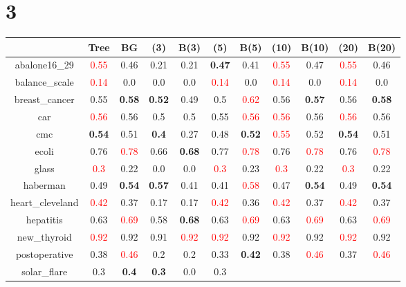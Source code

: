 \documentclass{article}%
\begin{document}
\section*{3}%
\begin{tabular}{c|cccccccccc}%
\hline%
&Tree&BG&(3)&B(3)&(5)&B(5)&(10)&B(10)&(20)&B(20)\\%
\hline%
abalone16\_29&\textcolor{red}{ 
0.55
}&0.46&0.21&0.21&\textbf{0.47}&0.41&\textcolor{red}{ 
0.55
}&0.47&\textcolor{red}{ 
0.55
}&0.46\\%
\hline%
balance\_scale&\textcolor{red}{ 
0.14
}&0.0&0.0&0.0&\textcolor{red}{ 
0.14
}&0.0&\textcolor{red}{ 
0.14
}&0.0&\textcolor{red}{ 
0.14
}&0.0\\%
\hline%
breast\_cancer&0.55&\textbf{0.58}&\textbf{0.52}&0.49&0.5&\textcolor{red}{ 
0.62
}&0.56&\textbf{0.57}&0.56&\textbf{0.58}\\%
\hline%
car&\textcolor{red}{ 
0.56
}&0.56&0.5&0.5&0.55&\textcolor{red}{ 
0.56
}&\textcolor{red}{ 
0.56
}&0.56&\textcolor{red}{ 
0.56
}&0.56\\%
\hline%
cmc&\textbf{0.54}&0.51&\textbf{0.4}&0.27&0.48&\textbf{0.52}&\textcolor{red}{ 
0.55
}&0.52&\textbf{0.54}&0.51\\%
\hline%
ecoli&0.76&\textcolor{red}{ 
0.78
}&0.66&\textbf{0.68}&0.77&\textcolor{red}{ 
0.78
}&0.76&\textcolor{red}{ 
0.78
}&0.76&\textcolor{red}{ 
0.78
}\\%
\hline%
glass&\textcolor{red}{ 
0.3
}&0.22&0.0&0.0&\textcolor{red}{ 
0.3
}&0.23&\textcolor{red}{ 
0.3
}&0.22&\textcolor{red}{ 
0.3
}&0.22\\%
\hline%
haberman&0.49&\textbf{0.54}&\textbf{0.57}&0.41&0.41&\textcolor{red}{ 
0.58
}&0.47&\textbf{0.54}&0.49&\textbf{0.54}\\%
\hline%
heart\_cleveland&\textcolor{red}{ 
0.42
}&0.37&0.17&0.17&\textcolor{red}{ 
0.42
}&0.36&\textcolor{red}{ 
0.42
}&0.37&\textcolor{red}{ 
0.42
}&0.37\\%
\hline%
hepatitis&0.63&\textcolor{red}{ 
0.69
}&0.58&\textbf{0.68}&0.63&\textcolor{red}{ 
0.69
}&0.63&\textcolor{red}{ 
0.69
}&0.63&\textcolor{red}{ 
0.69
}\\%
\hline%
new\_thyroid&\textcolor{red}{ 
0.92
}&0.92&0.91&\textcolor{red}{ 
0.92
}&\textcolor{red}{ 
0.92
}&0.92&\textcolor{red}{ 
0.92
}&0.92&\textcolor{red}{ 
0.92
}&0.92\\%
\hline%
postoperative&0.38&\textcolor{red}{ 
0.46
}&0.2&0.2&0.33&\textbf{0.42}&0.38&\textcolor{red}{ 
0.46
}&0.37&\textcolor{red}{ 
0.46
}\\%
\hline%
solar\_flare&0.3&\textbf{0.4}&\textbf{0.3}&0.0&0.3&\textcolor{red}{ 
}
\end{tabular}
\end{document}
